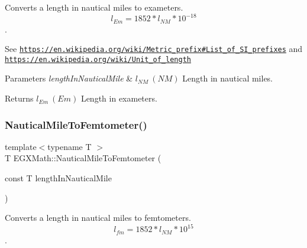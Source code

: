 Converts a length in nautical miles to exameters. \[ l_{Em}=1852 * l_{NM} * 10^{-18} \]. 

See \href{https://en.wikipedia.org/wiki/Metric_prefix#List_of_SI_prefixes}{\tt https\+://en.\+wikipedia.\+org/wiki/\+Metric\+\_\+prefix\#\+List\+\_\+of\+\_\+\+S\+I\+\_\+prefixes} and \href{https://en.wikipedia.org/wiki/Unit_of_length}{\tt https\+://en.\+wikipedia.\+org/wiki/\+Unit\+\_\+of\+\_\+length} 
\begin{DoxyParams}{Parameters}
{\em length\+In\+Nautical\+Mile} & $ l_{NM}\ (NM)$ Length in nautical miles. \\
\hline
\end{DoxyParams}
\begin{DoxyReturn}{Returns}
$ l_{Em}\ (Em)$ Length in exameters. 
\end{DoxyReturn}
\mbox{\label{group___e_g_x_math-_conversions-_length_conversions-_non-_s_i-_nautical_mile-_s_i_gacb38ddd47f497e26e3f0dcc8d32cca85}} 
\subsubsection{\texorpdfstring{Nautical\+Mile\+To\+Femtometer()}{NauticalMileToFemtometer()}}
{\footnotesize\ttfamily template$<$typename T $>$ \\
T E\+G\+X\+Math\+::\+Nautical\+Mile\+To\+Femtometer (\begin{DoxyParamCaption}\item[{const T}]{length\+In\+Nautical\+Mile }\end{DoxyParamCaption})}



Converts a length in nautical miles to femtometers. \[ l_{fm}=1852 * l_{NM} * 10^{15} \]. 

